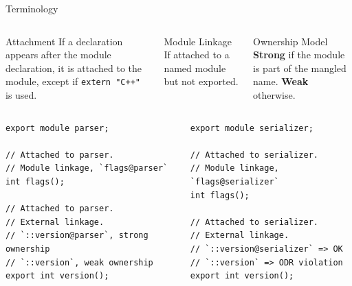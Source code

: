 \documentclass[aspectratio=169]{beamer}
\begin{document}
\begin{frame}[t,fragile]{Terminology}

  \begin{columns}[t]
    \begin{column}{0.3\textwidth}
      \begin{block}{\footnotesize Attachment}
        \justifying \footnotesize If a declaration appears after the module declaration, it is attached to the module, except if \texttt{extern "C++"} is used.
      \end{block}
    \end{column}

    \begin{column}{0.3\textwidth}
      \begin{block}{\footnotesize Module Linkage}
        \justifying   \footnotesize If attached to a named module but not exported.
      \end{block}
    \end{column}

    \begin{column}{0.3\textwidth}
      \begin{block}{\footnotesize Ownership Model}
        \justifying \footnotesize \textbf{Strong} if the module is part of the mangled name. \textbf{Weak} otherwise.
      \end{block}
    \end{column}
  \end{columns}

  \vspace{0.5em}

  \begin{columns}
    \begin{column}{0.5\textwidth}
      \begin{verbatim}
export module parser;

// Attached to parser.
// Module linkage, `flags@parser`
int flags();

// Attached to parser.
// External linkage.
// `::version@parser`, strong ownership
// `::version`, weak ownership
export int version();
\end{verbatim}
    \end{column}
    \begin{column}{0.5\textwidth}
      \begin{verbatim}
export module serializer;

// Attached to serializer.
// Module linkage, `flags@serializer`
int flags();

// Attached to serializer.
// External linkage.
// `::version@serializer` => OK
// `::version` => ODR violation
export int version();
  \end{verbatim}
    \end{column}
  \end{columns}
\end{frame}
\end{document}
